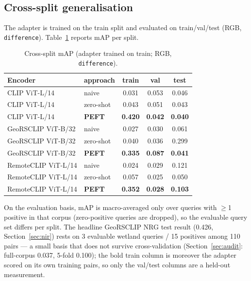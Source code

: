 \documentclass{article}
\begin{document}
\subsection{Cross-split generalisation}
\label{sec:crosssplit}

The adapter is trained on the train split and evaluated on train/val/test
(RGB, \texttt{difference}). Table~\ref{tab:crosssplit} reports mAP per split.

\begin{table}[H]
    \centering
    \caption{Cross-split mAP (adapter trained on train; RGB, \texttt{difference}).}
    \label{tab:crosssplit}
    \begin{tabular}{llccc}
        \toprule
        \textbf{Encoder} & \textbf{approach} & \textbf{train} & \textbf{val} & \textbf{test} \\
        \midrule
        CLIP ViT-L/14       & naive     & 0.031 & 0.053 & 0.046 \\
        CLIP ViT-L/14       & zero-shot & 0.043 & 0.051 & 0.043 \\
        CLIP ViT-L/14       & \textbf{PEFT} & \textbf{0.420} & \textbf{0.042} & \textbf{0.040} \\
        GeoRSCLIP ViT-B/32  & naive     & 0.027 & 0.030 & 0.061 \\
        GeoRSCLIP ViT-B/32  & zero-shot & 0.040 & 0.036 & 0.299 \\
        GeoRSCLIP ViT-B/32  & \textbf{PEFT} & \textbf{0.335} & \textbf{0.087} & \textbf{0.041} \\
        RemoteCLIP ViT-L/14 & naive     & 0.024 & 0.029 & 0.121 \\
        RemoteCLIP ViT-L/14 & zero-shot & 0.057 & 0.025 & 0.050 \\
        RemoteCLIP ViT-L/14 & \textbf{PEFT} & \textbf{0.352} & \textbf{0.028} & \textbf{0.103} \\
        \bottomrule
    \end{tabular}
\end{table}

\noindent On the evaluation basis, mAP is
macro-averaged only over queries with $\geq$1 positive in that corpus
(zero-positive queries are dropped), so the evaluable query set differs per
split. The headline GeoRSCLIP NRG test result (0.426, Section~\ref{sec:nir})
rests on 3 evaluable wetland queries / 15 positives among 110 pairs --- a small
basis that does not survive cross-validation (Section~\ref{sec:audit}:
full-corpus 0.037, 5-fold 0.100); the bold train column is moreover the
adapter scored on its own training pairs, so only the val/test columns are a
held-out measurement.
\end{document}
